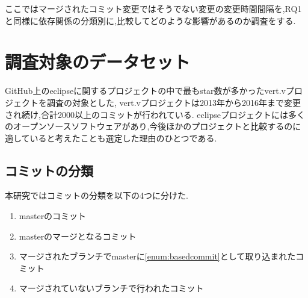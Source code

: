 \documentclass{fose2016}           %
\begin{document}
ここではマージされたコミット変更ではそうでない変更の変更時間間隔を,RQ1と同様に依存関係の分類別に,比較してどのような影響があるのか調査をする.

\section{調査対象のデータセット}\label{調査対象のデータセット}
GitHub上のeclipseに関するプロジェクトの中で最もstar数が多かったvert.vプロジェクトを調査の対象とした,
vert.vプロジェクトは2013年から2016年まで変更され続け,合計2000以上のコミットが行われている.
eclipseプロジェクトには多くのオープンソースソフトウェアがあり,今後ほかのプロジェクトと比較するのに適していると考えたことも選定した理由のひとつである.

\subsection{コミットの分類}
本研究ではコミットの分類を以下の4つに分けた.

\begin{enumerate}
\item masterのコミット \label{enum:basedcommit}
\item masterのマージとなるコミット \label{enum:mergecommit}
\item マージされたブランチでmasterに\ref{enum:basedcommit}として取り込まれたコミット \label{enum:mergedbranch}
\item マージされていないブランチで行われたコミット
\end{enumerate}
\end{document}
